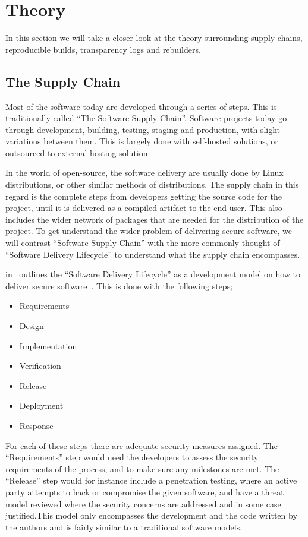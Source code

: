 \documentclass[../Main/thesis.tex]{subfiles}
\begin{document}
\chapter{Theory}
\label{ch:theory}
In this section we will take a closer look at the theory surrounding
supply chains, reproducible builds, transparency logs and rebuilders.

\section{The Supply Chain}\label{sec:supply_chain}
Most of the software today are developed through a series of steps. This is
traditionally called ``The Software Supply Chain''. Software projects today go
through development, building, testing, staging and production, with slight
variations between them. This is largely done with self-hosted solutions, or
outsourced to external hosting solution.

In the world of open-source, the software delivery are usually done by Linux
distributions, or other similar methods of distributions. The supply chain in
this regard is the complete steps from developers getting the source code for
the project, until it is delivered as a compiled artifact to the end-user. This
also includes the wider network of packages that are needed for the distribution
of the project. To get understand the wider problem of delivering secure
software, we will contrast ``Software Supply Chain'' with the more commonly
thought of ``Software Delivery Lifecycle'' to understand what the supply chain
encompasses.

\citeauthor{10.1109CSAC.2004.41} in~ outlines the
``Software Delivery Lifecycle'' as a development model on how to deliver secure
software~\cite{10.1109CSAC.2004.41}. This is done with the following steps;

\begin{itemize}
    \item Requirements
    \item Design
    \item Implementation
    \item Verification 
    \item Release
    \item Deployment
    \item Response
\end{itemize}

For each of these steps there are adequate security measures assigned. The
``Requirements'' step would need the developers to assess the security
requirements of the process, and to make sure any milestones are met. The
``Release'' step would for instance include a penetration testing, where an
active party attempts to hack or compromise the given software, and have a
threat model reviewed where the security concerns are addressed and in some case
justified.This model only encompasses the development and the code written by
the authors and is fairly similar to a traditional software models. 
\end{document}
